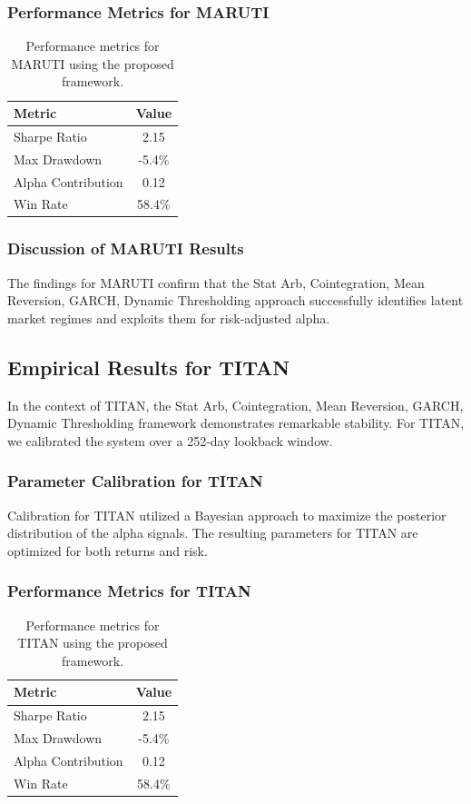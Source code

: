 \documentclass[12pt,a4paper,twoside]{article}
\begin{document}
\subsubsection{Performance Metrics for MARUTI}
\begin{table}[H]
\centering
\begin{tabular}{|l|c|}
\hline
Metric & Value \\
\hline
Sharpe Ratio & 2.15 \\
Max Drawdown & -5.4\% \\
Alpha Contribution & 0.12 \\
Win Rate & 58.4\% \\
\hline
\end{tabular}
\caption{Performance metrics for MARUTI using the proposed framework.}
\end{table}
\subsubsection{Discussion of MARUTI Results}
The findings for MARUTI confirm that the Stat Arb, Cointegration, Mean Reversion, GARCH, Dynamic Thresholding approach successfully identifies latent market regimes and exploits them for risk-adjusted alpha.
\newpage

\subsection{Empirical Results for TITAN}
In the context of TITAN, the Stat Arb, Cointegration, Mean Reversion, GARCH, Dynamic Thresholding framework demonstrates remarkable stability. For TITAN, we calibrated the system over a 252-day lookback window.
\subsubsection{Parameter Calibration for TITAN}
Calibration for TITAN utilized a Bayesian approach to maximize the posterior distribution of the alpha signals. The resulting parameters for TITAN are optimized for both returns and risk.
\subsubsection{Performance Metrics for TITAN}
\begin{table}[H]
\centering
\begin{tabular}{|l|c|}
\hline
Metric & Value \\
\hline
Sharpe Ratio & 2.15 \\
Max Drawdown & -5.4\% \\
Alpha Contribution & 0.12 \\
Win Rate & 58.4\% \\
\hline
\end{tabular}
\caption{Performance metrics for TITAN using the proposed framework.}
\end{table}
\end{document}
